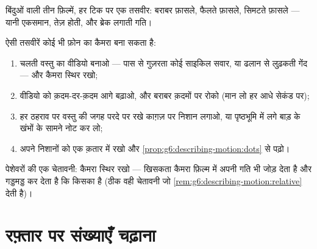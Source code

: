\begin{omfigure}

{\small बिंदुओं वाली तीन फ़िल्में, हर टिक पर एक तसवीर: बराबर फ़ासले,
फैलते फ़ासले, सिमटते फ़ासले --- यानी एकसमान, तेज़ होती, और ब्रेक
लगाती गति।}
\end{omfigure}

\begin{method}[बिंदुओं वाली फ़िल्म बनाना]\label{met:g6:describing-motion:film}
ऐसी तसवीरें कोई भी फ़ोन का कैमरा बना सकता है:
\begin{enumerate}
  \item चलती वस्तु का वीडियो बनाओ --- पास से गुज़रता कोई साइकिल
        सवार, या ढलान से लुढ़कती गेंद --- और कैमरा स्थिर रखो;
  \item वीडियो को क़दम-दर-क़दम आगे बढ़ाओ, और बराबर क़दमों पर रोको
        (मान लो हर आधे सेकंड पर);
  \item हर ठहराव पर वस्तु की जगह परदे पर रखे काग़ज़ पर निशान लगाओ,
        या पृष्ठभूमि में लगे बाड़ के खंभों के सामने नोट कर लो;
  \item अपने निशानों को एक क़तार में रखो और
        \cref{prop:g6:describing-motion:dots} से पढ़ो।
\end{enumerate}
पेशेवरों की एक चेतावनी: कैमरा स्थिर रखो --- खिसकता कैमरा फ़िल्म में
अपनी गति भी जोड़ देता है और गड्डमड्ड कर देता है कि  किसका है
(ठीक वही चेतावनी जो \cref{rem:g6:describing-motion:relative} देती
है)।
\end{method}

\section{रफ़्तार पर संख्याएँ चढ़ाना}

